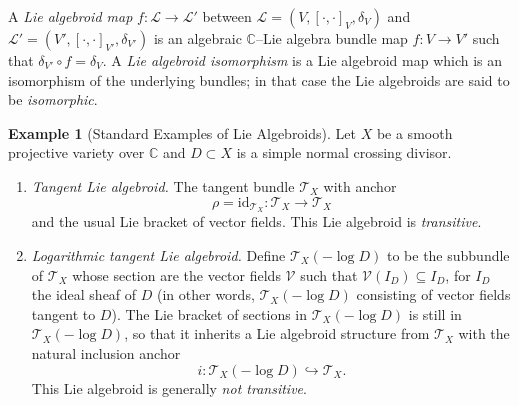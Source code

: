 \documentclass[12pt,reqno]{amsart}
\numberwithin{equation}{subsection}
\theoremstyle{definition}
\newtheorem{example}[equation]{Example}
\theoremstyle{theorem}
\begin{document}
A \textit{Lie algebroid map} $f:\mathcal{L}\rightarrow \mathcal{L}'$ between $\mathcal{L}=(V,[\cdot,\cdot]_{V},\delta_{V})$ and $\mathcal{L}'=(V',[\cdot,\cdot]_{V'},\delta_{V'})$ is an algebraic $\mathbb{C}$--Lie algebra bundle map  $f:V\rightarrow V'$ such that $\delta_{V'}\circ f = \delta_{V}$. A \textit{Lie algebroid isomorphism} is a Lie algebroid map which is an isomorphism of the underlying bundles; in that case the Lie algebroids are said to be \textit{isomorphic}.
\begin{example}[Standard Examples of Lie Algebroids]
Let $X$ be a smooth projective variety over $\mathbb{C}$ and $D \subset X$ is a simple normal crossing divisor.
	
\begin{enumerate}
\item \textit{Tangent Lie algebroid.}  
The tangent bundle $\mathcal{T}_X$ with anchor
		\[
		\rho = \mathrm{id}_{\mathcal{T}_X} : \mathcal{T}_X \to \mathcal{T}_X
		\]
		and the usual Lie bracket of vector fields.  
		This Lie algebroid is \emph{transitive}.
		
		\item \textit{Logarithmic tangent Lie algebroid.}  
		Define $\mathcal{T}_X(-\log D)$ to be the subbundle of $\mathcal{T}_{X}$ whose section are the vector fields $\mathcal{V}$ such that $\mathcal{V}(I_{D})\subseteq I_{D}$, for $I_{D}$ the ideal sheaf of $D$ (in other words, $\mathcal{T}_{X}(-\log D)$ consisting of vector fields tangent to $D$). The Lie bracket of sections in $\mathcal{T}_{X}(-\log D)$ is still in  $\mathcal{T}_{X}(-\log D)$, so that it inherits a Lie algebroid structure from $\mathcal{T}_{X}$
		with the natural inclusion anchor
		\[
		i : \mathcal{T}_X(-\log D) \hookrightarrow \mathcal{T}_X.
		\]
		This Lie algebroid is generally \emph{not transitive}.
		

\end{enumerate}
\end{example}
\end{document}
